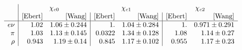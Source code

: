 $$
\begin{array}{r|rr|rr|rr}
  &\multicolumn{2}{c}{\chi_{c0}} & \multicolumn{2}{c}{\chi_{c1}} & \multicolumn{2}{c}{\chi_{c2}} \\
   & \text{[Ebert]} & \text{[Wang]} & \text{[Ebert]} & \text{[Wang]} & \text{[Ebert]} & \text{[Wang]} \\
\hline
 e\nu & 1.02 & 1.06\pm 0.244 & 1. & 1.04\pm 0.284 & 1. & 0.971\pm 0.291 \\
 \pi & 1.03 & 1.13\pm 0.145 & 0.0322 & 1.34\pm 0.128 & 1.08 & 1.14\pm 0.27 \\
 \rho & 0.943 & 1.19\pm 0.14 & 0.845 & 1.17\pm 0.102 & 0.955 & 1.17\pm 0.23 \\
\end{array}
$$